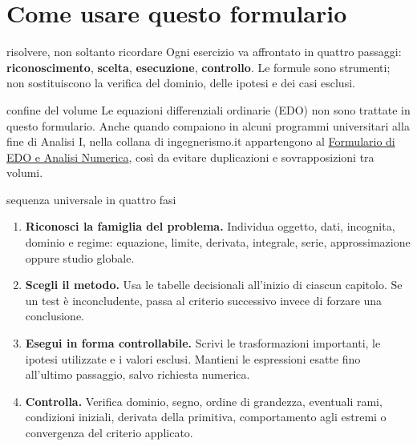 \chapter*{Come usare questo formulario}

\begin{obiettivocapitolo}{risolvere, non soltanto ricordare}
Ogni esercizio va affrontato in quattro passaggi: \textbf{riconoscimento}, \textbf{scelta}, \textbf{esecuzione}, \textbf{controllo}. Le formule sono strumenti; non sostituiscono la verifica del dominio, delle ipotesi e dei casi esclusi.
\end{obiettivocapitolo}

\begin{teoriaessenziale}{confine del volume}
Le equazioni differenziali ordinarie (EDO) non sono trattate in questo formulario. Anche quando compaiono in alcuni programmi universitari alla fine di Analisi I, nella collana di ingegnerismo.it appartengono al \href{https://ingegnerismo.it/matematica/formulario-edo-analisi-numerica/}{Formulario di EDO e Analisi Numerica}, così da evitare duplicazioni e sovrapposizioni tra volumi.
\end{teoriaessenziale}

\begin{proceduraesame}{sequenza universale in quattro fasi}
\begin{enumerate}
\item \textbf{Riconosci la famiglia del problema.} Individua oggetto, dati, incognita, dominio e regime: equazione, limite, derivata, integrale, serie, approssimazione oppure studio globale.
\item \textbf{Scegli il metodo.} Usa le tabelle decisionali all'inizio di ciascun capitolo. Se un test è inconcludente, passa al criterio successivo invece di forzare una conclusione.
\item \textbf{Esegui in forma controllabile.} Scrivi le trasformazioni importanti, le ipotesi utilizzate e i valori esclusi. Mantieni le espressioni esatte fino all'ultimo passaggio, salvo richiesta numerica.
\item \textbf{Controlla.} Verifica dominio, segno, ordine di grandezza, eventuali rami, condizioni iniziali, derivata della primitiva, comportamento agli estremi o convergenza del criterio applicato.
\end{enumerate}
\end{proceduraesame}

